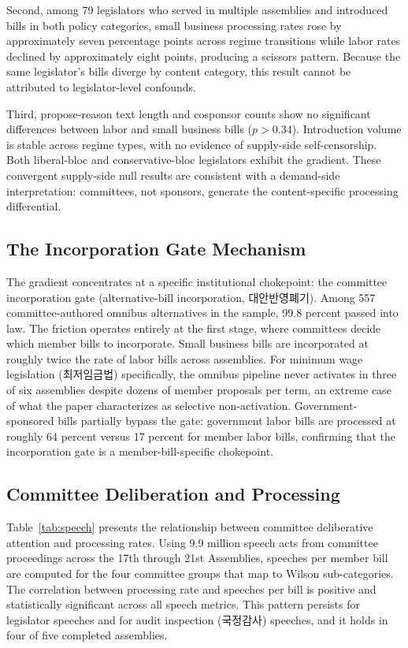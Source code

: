 \documentclass[11pt]{article}
\begin{document}
Second, among 79 legislators who served in multiple assemblies and introduced bills in both policy categories, small business processing rates rose by approximately seven percentage points across regime transitions while labor rates declined by approximately eight points, producing a scissors pattern. Because the same legislator's bills diverge by content category, this result cannot be attributed to legislator-level confounds.

Third, propose-reason text length and cosponsor counts show no significant differences between labor and small business bills ($p > 0.34$). Introduction volume is stable across regime types, with no evidence of supply-side self-censorship. Both liberal-bloc and conservative-bloc legislators exhibit the gradient. These convergent supply-side null results are consistent with a demand-side interpretation: committees, not sponsors, generate the content-specific processing differential.

\subsection{The Incorporation Gate Mechanism}

The gradient concentrates at a specific institutional chokepoint: the committee incorporation gate (alternative-bill incorporation, 대안반영폐기). Among 557 committee-authored omnibus alternatives in the sample, 99.8 percent passed into law. The friction operates entirely at the first stage, where committees decide which member bills to incorporate. Small business bills are incorporated at roughly twice the rate of labor bills across assemblies. For minimum wage legislation (최저임금법) specifically, the omnibus pipeline never activates in three of six assemblies despite dozens of member proposals per term, an extreme case of what the paper characterizes as selective non-activation. Government-sponsored bills partially bypass the gate: government labor bills are processed at roughly 64 percent versus 17 percent for member labor bills, confirming that the incorporation gate is a member-bill-specific chokepoint.

\subsection{Committee Deliberation and Processing}

Table~\ref{tab:speech} presents the relationship between committee deliberative attention and processing rates. Using 9.9 million speech acts from committee proceedings across the 17th through 21st Assemblies, speeches per member bill are computed for the four committee groups that map to Wilson sub-categories. The correlation between processing rate and speeches per bill is positive and statistically significant across all speech metrics. This pattern persists for legislator speeches and for audit inspection (국정감사) speeches, and it holds in four of five completed assemblies.
\end{document}
